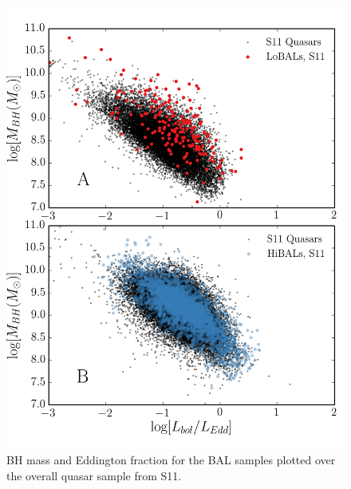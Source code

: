 
\begin{figure} %
\centering
\includegraphics[width=1.0\textwidth]{figures/ewpaper/bals_2x2_scatter.png}
\caption
{
BH mass and Eddington fraction for the BAL samples plotted 
over the overall quasar sample from S11.
}
\label{fig:bal_scatter}
\end{figure} %



